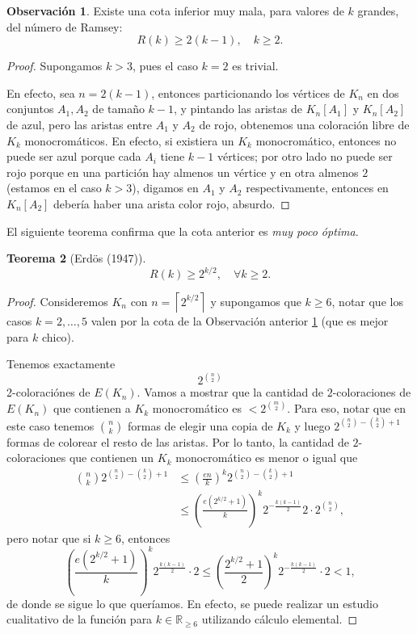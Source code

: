 \documentclass[12pt]{report}
\theoremstyle{plain}
\newtheorem{theorem}{Teorema}[section]
\theoremstyle{definition}
\newtheorem{obs}[theorem]{Observación}
\newcommand{\reals}{\mathbb{R}}
\newcommand{\ceil}[1]{\left\lceil #1  \right\rceil}
\begin{document}
\begin{obs}\label{obs:cota inferior trivial del numero de ramsey (orden lineal)}
Existe una cota inferior muy mala, para valores de $k$ grandes, del número de Ramsey:
\[
    R(k) \geq 2 (k-1), \quad k \geq 2.
\]
\end{obs}
\begin{proof}
Supongamos $k > 3$, pues el caso $k = 2$ es trivial.

En efecto, sea $n = 2 (k-1)$, entonces particionando los vértices de $K_n$ en dos conjuntos $A_1, A_2$ de tamaño $k-1$, y pintando las aristas de $K_n[A_1]$ y $K_n[A_2]$ de azul, pero las aristas entre $A_1$ y $A_2$ de rojo, obtenemos una coloración libre de $K_k$ monocromáticos. En efecto, si existiera un $K_k$ monocromático, entonces no puede ser azul porque cada $A_i$ tiene $k-1$ vértices; por otro lado no puede ser rojo porque en una partición hay almenos un vértice y en otra almenos $2$ (estamos en el caso $k > 3$), digamos en $A_1$ y $A_2$ respectivamente, entonces en $K_n [A_2]$ debería haber una arista color rojo, absurdo.
\end{proof}
El siguiente teorema confirma que la cota anterior es \textit{muy poco óptima}.

\begin{theorem}[Erdös (1947)]
\[
    R(k)  \geq 2^{k/2}, \quad \forall k \geq 2.
\]
\end{theorem}
\begin{proof}
Consideremos $K_n$ con $n = \ceil{2^{k/2}}$ y supongamos que $k \geq 6$, notar que los casos $k = 2 , \ldots, 5$ valen por la cota de la Observación anterior \ref{obs:cota inferior trivial del numero de ramsey (orden lineal)} (que es mejor para $k$ chico).

Tenemos exactamente
\[
    2^{\binom n 2}
\]
2-coloraciónes de $E(K_n)$. Vamos a mostrar que la cantidad de $2$-coloraciones de $E(K_n)$ que contienen a $K_k$ monocromático es $< 2^{\binom m 2}$. Para eso, notar que en este caso tenemos $\binom n k$ formas de elegir una copia de $K_k$ y luego $2^{\binom n 2 - \binom k 2 + 1}$ formas de colorear el resto de las aristas. Por lo tanto, la cantidad de $2$-coloraciones que contienen un $K_k$ monocromático es menor o igual que
\begin{align*}
\binom n k 2^{\binom n 2 - \binom k 2 + 1} &\leq \left (\frac{en}{k} \right )^{k} 2^{\binom n 2 - \binom k 2 + 1} \\
&\leq \left ( \frac{e (2^{k/2} + 1)}{k} \right )^k 2^{-\frac{k(k-1)}{2}} 2 \cdot 2^ {\binom n 2},
\end{align*}
pero notar que si $k \geq 6$, entonces
\[
    \left ( \frac{e (2^{k/2} + 1)}{k} \right )^k 2^{\frac{k(k-1)}{2}} \cdot 2 \leq \left ( \frac{2^{k/2} + 1}{2} \right )^k 2^{- \frac{k(k-1)}{2}} \cdot 2< 1,
\]
de donde se sigue lo que queríamos. En efecto, se puede realizar un estudio cualitativo de la función para $k \in \reals_{\geq 6}$ utilizando cálculo elemental.
\end{proof}
\end{document}
